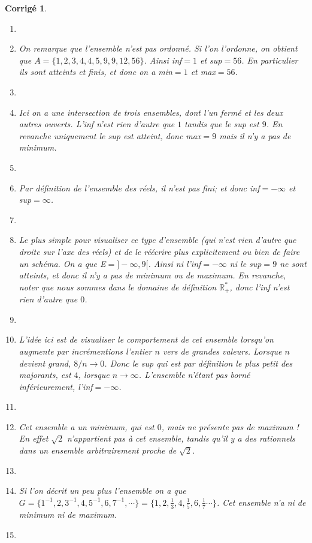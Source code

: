 \documentclass[11pt,french,table]{article}
\theoremstyle{exercice}
\theoremstyle{corrigé}
\newtheorem{corrigé}{Corrigé}
\begin{document}
\begin{corrigé}
\begin{enumerate}
\item[]
 \item[(A) ] On remarque que l'ensemble n'est pas ordonné. Si l'on l'ordonne, on obtient que $A=\{1,2,3,4,4,5,9,9,12,56\}$. Ainsi inf$=1$ et sup$=56$. En particulier ils sont atteints et finis, et donc on a min$=1$ et max$=56$.
         \item[]
    \item[(B)] Ici on a une intersection de trois ensembles, dont l'un fermé et les deux autres ouverts. L'inf n'est rien d'autre que $1$ tandis que le sup est $9$. En revanche uniquement le sup  est atteint, donc max$=9$ mais il n'y a pas de minimum. 
    \item[]
    \item[(C) ] Par définition de l'ensemble des réels, il n'est pas fini; et donc inf$=-\infty$ et sup$=\infty$. 
    \item[]
    \item[(D) ] Le plus simple pour visualiser ce type d'ensemble (qui n'est rien d'autre que droite sur l'axe des réels) et de le réécrire plus explicitement ou bien de faire un schéma. On a que E$=]-\infty,9[$. Ainsi ni l'inf$=-\infty$ ni le sup$=9$ ne sont atteints, et donc il n'y a pas de minimum ou de maximum. En revanche, noter que nous sommes dans le domaine de définition $\mathbb{R}_+^{*}$, donc l'inf n'est rien d'autre que $0$. 
    \item[]
    \item[(E) ] L'idée ici est de visualiser le comportement de cet ensemble lorsqu'on augmente par incrémentions l'entier $n$ vers de grandes valeurs. Lorsque $n$ devient grand, $8/n \to 0$. Donc le sup qui est par définition le plus petit des majorants, est $4$, lorsque $n\to \infty$. L'ensemble n'étant pas borné inférieurement, l'inf$=-\infty$. 
     \item[]
    \item[(F) ] Cet ensemble a un minimum, qui est $0$, mais ne présente pas de maximum ! En effet $\sqrt{2}$ n'appartient pas à cet ensemble, tandis qu'il y a des rationnels dans un ensemble arbitrairement proche de $\sqrt{2}$. 
    \item[]
    \item[\textbf{Bonus} : (G) ] Si l'on décrit un peu plus l'ensemble on a que $G=\{1^{-1},2,3^{-1},4,5^{-1},6,7^{-1},\cdots\}=\{1,2,\frac{1}{3},4,\frac{1}{5},6,\frac{1}{7}\cdots\}$. Cet ensemble n'a ni de minimum ni de maximum. 
    \item[]
\end{enumerate}
\end{corrigé}
\end{document}

